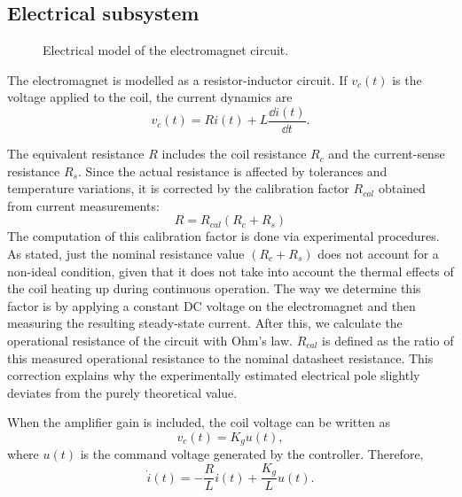 \subsection{Electrical subsystem}
\begin{figure}[ht]
    \centering
    \caption{Electrical model of the electromagnet circuit.}
    \label{fig:rl_detailed}
\end{figure}

The electromagnet is modelled as a resistor-inductor circuit. If $v_c(t)$ is the voltage applied to the coil, the current dynamics are
\begin{equation}
    v_c(t) = R i(t) + L \frac{\dd i(t)}{\dd t}.
    \label{eq:electrical_rl}
\end{equation}

The equivalent resistance $R$ includes the coil resistance $R_c$ and the current-sense resistance $R_s$.
Since the actual resistance is affected by tolerances and temperature variations, it is corrected by
the calibration factor $R_{cal}$ obtained from current measurements:
\[
R = R_{cal}(R_c + R_s)
\]
The computation of this calibration factor is done via experimental procedures. As stated, just the nominal resistance value $(R_c + R_s)$ does not account for a non-ideal condition, given that it does not take into account the thermal effects of the coil heating up during continuous operation. The way we determine this factor is by applying a constant DC voltage on the electromagnet and then measuring the resulting steady-state current. After this, we calculate the operational resistance of the circuit with Ohm's law. $R_{cal}$ is defined as the ratio of this measured operational resistance to the nominal datasheet resistance. This correction explains why the experimentally estimated electrical pole slightly deviates from the purely theoretical value.

When the amplifier gain is included, the coil voltage can be written as
\begin{equation}
    v_c(t) = K_g u(t),
\end{equation}
where $u(t)$ is the command voltage generated by the controller. Therefore,
\begin{equation}
    \dot{i}(t) = -\frac{R}{L}i(t) + \frac{K_g}{L}u(t).
    \label{eq:current_dynamics}
\end{equation}


